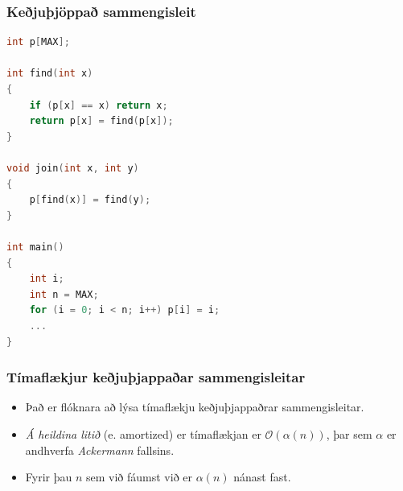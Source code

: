 \documentclass{beamer}
\begin{document}
\begin{frame}[fragile]
	\frametitle{Keðjuþjöppað sammengisleit}
\tiny
\begin{lstlisting}[language=C++]
int p[MAX];

int find(int x)
{
	if (p[x] == x) return x;
	return p[x] = find(p[x]);
}

void join(int x, int y)
{
	p[find(x)] = find(y);
}

int main()
{
	int i;
	int n = MAX;
	for (i = 0; i < n; i++) p[i] = i;
	...
}
\end{lstlisting}
\end{frame}

\begin{frame}
\frametitle{Tímaflækjur keðjuþjappaðar sammengisleitar}
\begin{itemize}
	\item<1-> Það er flóknara að lýsa tímaflækju keðjuþjappaðrar sammengisleitar.
	\item<2-> \emph{Á heildina litið} (e. amortized) er tímaflækjan er $\mathcal{O}(\alpha(n))$, þar sem $\alpha$ er andhverfa \emph{Ackermann} fallsins.
	\item<3-> Fyrir þau $n$ sem við fáumst við er $\alpha(n)$ nánast fast.
\end{itemize}
\end{frame}
\end{document}
